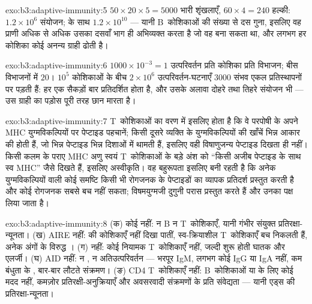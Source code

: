 \begin{solution}{exo:b3:adaptive-immunity:5}
$50\times 20\times 5 = 5000$ भारी शृंखलाएँ, $60\times 4 = 240$ हल्की:
$1.2\times 10^{6}$ संयोजन;  के साथ $1.2\times
10^{10}$ --- यानी B~कोशिकाओं की संख्या से दस गुना, इसलिए वह प्राणी
अधिक से अधिक उसका दसवाँ भाग ही अभिव्यक्त करता है जो वह बना सकता था, और
लगभग हर कोशिका कोई अनन्य ग्राही ढोती है।
\end{solution}

\begin{solution}{exo:b3:adaptive-immunity:6}
$1000\times 10^{-3} = 1$ उत्परिवर्तन प्रति कोशिका प्रति विभाजन; बीस
विभाजनों में $20$। $10^{5}$ कोशिकाओं के बीच $2\times 10^{6}$
उत्परिवर्तन-घटनाएँ $3000$ संभव एकल प्रतिस्थापनों पर पड़ती हैं: हर एक
सैकड़ों बार प्रतिदर्शित होता है, और उसके अलावा दोहरे तथा तिहरे संयोजन
भी ---  उस ग्राही का पड़ोस पूरी तरह छान मारता है।
\end{solution}

\begin{solution}{exo:b3:adaptive-immunity:7}
T~कोशिकाओं का वरण  में इसलिए होता है कि वे परपोषी के अपने MHC
युग्मविकल्पियों पर पेप्टाइड पहचानें; किसी दूसरे व्यक्ति के
युग्मविकल्पियों की खाँचें भिन्न आकार की होती हैं, जो भिन्न पेप्टाइड
भिन्न दिशाओं में थामती हैं, इसलिए वही विषाणुजन्य पेप्टाइड दिखता ही
नहीं। किसी कलम के पराए MHC अणु स्वयं T~कोशिकाओं के बड़े अंश को ``किसी
अजीब पेप्टाइड के साथ स्व MHC'' जैसे दिखते हैं, इसलिए अस्वीकृति। वह
बहुरूपता इसलिए बनी रहती है कि अनेक युग्मविकल्पियों वाली कोई समष्टि किसी
भी रोगजनक के पेप्टाइडों का व्यापक प्रतिदर्श प्रस्तुत करती है और कोई
रोगजनक सबसे बच नहीं सकता; विषमयुग्मजी दुगुनी परास प्रस्तुत करते हैं और
उनका पक्ष लिया जाता है।
\end{solution}

\begin{solution}{exo:b3:adaptive-immunity:8}
(क) कोई  नहीं: न B न T~कोशिकाएँ, यानी गंभीर संयुक्त
प्रतिरक्षा-न्यूनता। (ख) AIRE नहीं:  की कोशिकाएँ  नहीं
दिखा पातीं, स्व-क्रियाशील T~कोशिकाएँ बच निकलती हैं, अनेक अंगों के
विरुद्ध । (ग)  नहीं: कोई नियामक T~कोशिकाएँ नहीं,
जल्दी शुरू होती घातक  और एलर्जी। (घ) AID नहीं: न
, न अतिउत्परिवर्तन --- भरपूर IgM, लगभग कोई IgG या IgA
नहीं, कम बंधुता के , बार-बार लौटते संक्रमण। (ङ) CD4
T~कोशिकाएँ नहीं: B~कोशिकाओं या  के लिए कोई मदद नहीं, कमज़ोर
प्रतिरक्षी-अनुक्रियाएँ और अवसरवादी संक्रमणों के प्रति संवेद्यता ---
यानी एड्स की प्रतिरक्षा-न्यूनता।
\end{solution}

